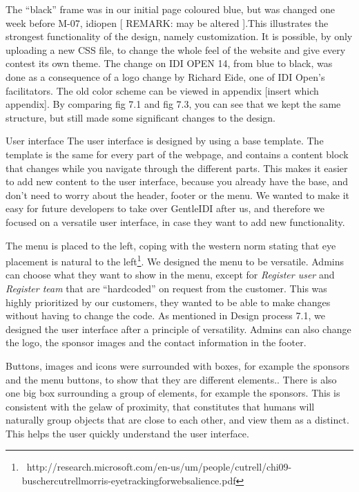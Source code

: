 The ``black'' frame was in our
initial page coloured blue, but was changed one week before M-07,
idiopen [ REMARK: may be altered ].This illustrates the strongest
functionality of the design, namely customization. It is possible, by
only uploading a new CSS file, to change the whole feel of the website
and give every contest its own theme. The change on IDI OPEN 14, from
blue to black, was done as a consequence of a logo change by Richard
Eide, one of IDI Open's facilitators. The old color
scheme can be viewed in appendix [insert which appendix]. By comparing
fig 7.1 and fig 7.3, you can see that we kept the same structure, but
still made some significant changes to the design.


User interface
The user interface is designed by using a base template. The template is
the same for every part of the webpage, and contains a content block
that changes while you navigate through the different parts. This makes
it easier to add new content to the user interface, because you already
have the base, and don't need to worry about the
header, footer or the menu. We wanted to make it easy for future
developers to take over GentleIDI after us, and therefore we focused on
a versatile user interface, in case they want to add new functionality.

The menu is placed to the left, coping with the western norm stating
that eye placement is natural to the
left\footnote{\ http://research.microsoft.com/en-us/um/people/cutrell/chi09-buschercutrellmorris-eyetrackingforwebsalience.pdf}.
We designed the menu to be versatile. Admins can choose what they want
to show in the menu, except for \textit{Register user} and
\textit{Register team }that are
``hardcoded'' on request from the
customer. This was highly prioritized by our customers, they wanted to
be able to make changes without having to change the code. As mentioned
in Design process 7.1, we designed the user interface after a principle
of versatility. Admins can also change the logo, the sponsor images and
the contact information in the footer.

Buttons, images and icons were surrounded with boxes, for example the
sponsors and the menu buttons, to show that they are different
elements.. There is also one big box surrounding a group of elements,
for example the sponsors. This is consistent with the ge\stalt law of
proximity, that constitutes that humans will naturally group objects
that are close to each other, and view them as a distinct.
This helps the user quickly understand the user interface.


